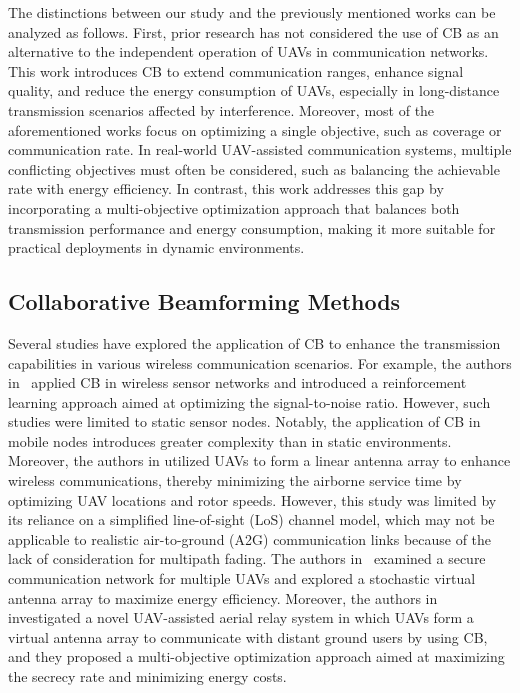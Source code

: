 \par The distinctions between our study and the previously mentioned works can be analyzed as follows. First, prior research has not considered the use of CB as an alternative to the independent operation of UAVs in communication networks. This work introduces CB to extend communication ranges, enhance signal quality, and reduce the energy consumption of UAVs, especially in long-distance transmission scenarios affected by interference. Moreover, most of the aforementioned works focus on optimizing a single objective, such as coverage or communication rate. In real-world UAV-assisted communication systems, multiple conflicting objectives must often be considered, such as balancing the achievable rate with energy efficiency. In contrast, this work addresses this gap by incorporating a multi-objective optimization approach that balances both transmission performance and energy consumption, making it more suitable for practical deployments in dynamic environments.


\subsection{Collaborative Beamforming Methods}
\label{subsec:Collaborative Beamforming}

\par Several studies have explored the application of CB to enhance the transmission capabilities in various wireless communication scenarios. For example, the authors in~\cite{Bao2019astochastic} applied CB in wireless sensor networks and introduced a reinforcement learning approach aimed at optimizing the signal-to-noise ratio. However, such studies were limited to static sensor nodes. Notably, the application of CB in mobile nodes introduces greater complexity than in static environments. Moreover, the authors in  \cite{Mozaffari2019communicationsandcontrol} utilized UAVs to form a linear antenna array to enhance wireless communications, thereby minimizing the airborne service time by optimizing UAV locations and rotor speeds. However, this study was limited by its reliance on a simplified line-of-sight (LoS) channel model, which may not be applicable to realistic air-to-ground (A2G) communication links because of the lack of consideration for multipath fading. The authors in~\cite{Jung2022securityenergy} examined a secure communication network for multiple UAVs and explored a stochastic virtual antenna array to maximize energy efficiency. Moreover, the authors in~\cite{sun2022secure} investigated a novel UAV-assisted aerial relay system in which UAVs form a virtual antenna array to communicate with distant ground users by using CB, and they proposed a multi-objective optimization approach aimed at maximizing the secrecy rate and minimizing energy costs. 

